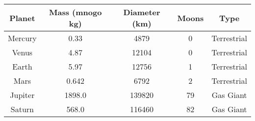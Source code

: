 \documentclass{article}
\begin{document}
\begin{tabular}{|c|c|c|c|c|}
\hline
Planet & Mass (mnogo kg) & Diameter (km) & Moons & Type \\
\hline
Mercury & 0.33 & 4879 & 0 & Terrestrial \\
\hline
Venus & 4.87 & 12104 & 0 & Terrestrial \\
\hline
Earth & 5.97 & 12756 & 1 & Terrestrial \\
\hline
Mars & 0.642 & 6792 & 2 & Terrestrial \\
\hline
Jupiter & 1898.0 & 139820 & 79 & Gas Giant \\
\hline
Saturn & 568.0 & 116460 & 82 & Gas Giant \\
\hline
\end{tabular}
\end{document}
